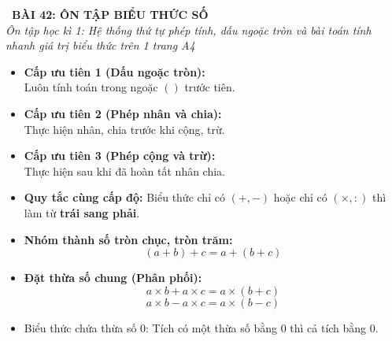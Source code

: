 \documentclass[11pt,a4paper]{article}
\begin{document}
\begin{tcolorbox}[
  enhanced,
  colback=white,
  colframe=primary,
  arc=3mm,
  boxrule=1.2pt,
  left=4mm, right=4mm, top=2.5mm, bottom=2.5mm,
  drop shadow=black!10!white
]
  \centering
  {\Large\bfseries\color{primary}\faBookmark\ BÀI 42: ÔN TẬP BIỂU THỨC SỐ}\\[1.5mm]
  {\small\itshape\color{black!75}Ôn tập học kì 1: Hệ thống thứ tự phép tính, dấu ngoặc tròn và bài toán tính nhanh giá trị biểu thức trên 1 trang A4}
\end{tcolorbox}

\vspace{-2mm}


\noindent
\begin{minipage}[t]{0.49\textwidth}\vspace{0pt}
\begin{tcolorbox}[
  enhanced,
  colback=blue!4!white,
  colframe=blue!75!black,
  arc=2mm, boxrule=0.8pt,
  left=2mm, right=2mm, top=1.8mm, bottom=1.8mm,
  title={\footnotesize\bfseries\color{white}\faKey\ 1. Kim chỉ nam thứ tự thực hiện}
]
{\footnotesize
\begin{itemize}\setlength{\itemsep}{1.5pt}\setlength{\leftskip}{-2.5mm}
  \item \textbf{Cấp ưu tiên 1 (Dấu ngoặc tròn):}\\
  Luôn tính toán trong ngoặc $( )$ trước tiên.
  \item \textbf{Cấp ưu tiên 2 (Phép nhân và chia):}\\
  Thực hiện nhân, chia trước khi cộng, trừ.
  \item \textbf{Cấp ưu tiên 3 (Phép cộng và trừ):}\\
  Thực hiện sau khi đã hoàn tất nhân chia.
  \item \textbf{Quy tắc cùng cấp độ:} Biểu thức chỉ có $(+, -)$ hoặc chỉ có $(\times, :)$ thì làm từ \textbf{trái sang phải}.
\end{itemize}
}
\end{tcolorbox}
\end{minipage}
\hfill
\begin{minipage}[t]{0.49\textwidth}\vspace{0pt}
\begin{tcolorbox}[
  enhanced,
  colback=teal!4!white,
  colframe=teal!75!black,
  arc=2mm, boxrule=0.8pt,
  left=2mm, right=2mm, top=1.8mm, bottom=1.8mm,
  title={\footnotesize\bfseries\color{white}\faMagic\ 2. Mẹo tính nhanh giá trị biểu thức}
]
{\footnotesize
\begin{itemize}\setlength{\itemsep}{1.5pt}\setlength{\leftskip}{-2.5mm}
  \item \textbf{Nhóm thành số tròn chục, tròn trăm:}
  $$(a + b) + c = a + (b + c)$$
  \item \textbf{Đặt thừa số chung (Phân phối):}
  $$a \times b + a \times c = a \times (b + c)$$
  $$a \times b - a \times c = a \times (b - c)$$
  \item Biểu thức chứa thừa số $0$: Tích có một thừa số bằng $0$ thì cả tích bằng $0$.
\end{itemize}
}
\end{tcolorbox}
\end{minipage}
\end{document}
